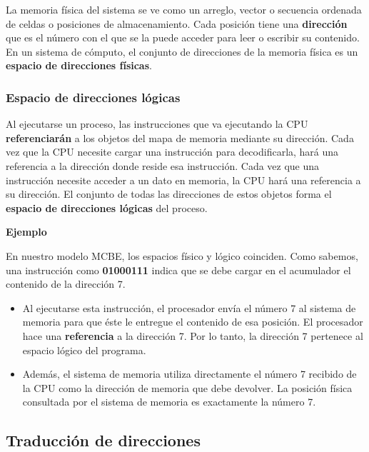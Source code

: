 \documentclass[spanish,a4paper,]{article}
\providecommand{\tightlist}{%
  \setlength{\itemsep}{0pt}\setlength{\parskip}{0pt}}
\begin{document}
La memoria física del sistema se ve como un arreglo, vector o secuencia
ordenada de celdas o posiciones de almacenamiento. Cada posición tiene
una \textbf{dirección} que es el número con el que se la puede acceder
para leer o escribir su contenido. En un sistema de cómputo, el conjunto
de direcciones de la memoria física es un \textbf{espacio de direcciones
físicas}.

\hypertarget{espacio-de-direcciones-luxf3gicas}{%
\subsubsection{Espacio de direcciones
lógicas}\label{espacio-de-direcciones-luxf3gicas}}

Al ejecutarse un proceso, las instrucciones que va ejecutando la CPU
\textbf{referenciarán} a los objetos del mapa de memoria mediante su
dirección. Cada vez que la CPU necesite cargar una instrucción para
decodificarla, hará una referencia a la dirección donde reside esa
instrucción. Cada vez que una instrucción necesite acceder a un dato en
memoria, la CPU hará una referencia a su dirección. El conjunto de todas
las direcciones de estos objetos forma el \textbf{espacio de direcciones
lógicas} del proceso.

\textbf{Ejemplo}

En nuestro modelo MCBE, los espacios físico y lógico coinciden. Como
sabemos, una instrucción como \textbf{01000111} indica que se debe
cargar en el acumulador el contenido de la dirección 7.

\begin{itemize}
\tightlist
\item
  Al ejecutarse esta instrucción, el procesador envía el número 7 al
  sistema de memoria para que éste le entregue el contenido de esa
  posición. El procesador hace una \textbf{referencia} a la dirección 7.
  Por lo tanto, la dirección 7 pertenece al espacio lógico del programa.
\item
  Además, el sistema de memoria utiliza directamente el número 7
  recibido de la CPU como la dirección de memoria que debe devolver. La
  posición física consultada por el sistema de memoria es exactamente la
  número 7.
\end{itemize}

\hypertarget{traducciuxf3n-de-direcciones}{%
\subsection{Traducción de
direcciones}\label{traducciuxf3n-de-direcciones}}
\end{document}

